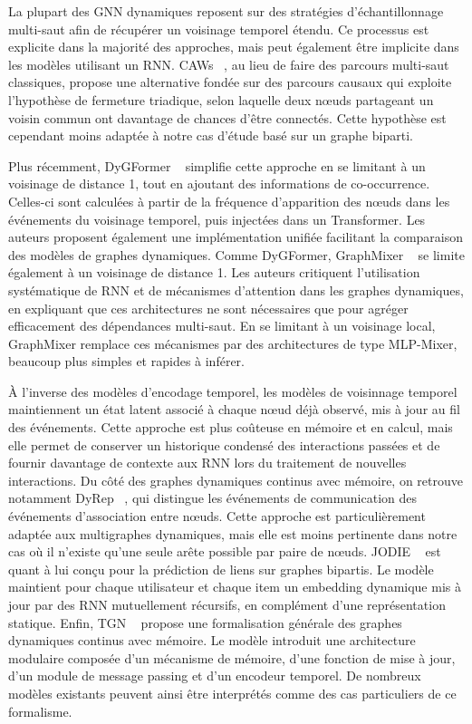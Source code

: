 \documentclass[a4paper,11pt,twoside]{StyleThese}
\begin{document}
La plupart des GNN dynamiques reposent sur des stratégies d'échantillonnage multi-saut afin de récupérer un voisinage temporel étendu. Ce processus est explicite dans la majorité des approches, mais peut également être implicite dans les modèles utilisant un RNN. CAWs ~\cite{cawn}, au lieu de faire des parcours multi-saut classiques, propose une alternative fondée sur des parcours causaux qui exploite l’hypothèse de fermeture triadique, selon laquelle deux nœuds partageant un voisin commun ont davantage de chances d’être connectés. Cette hypothèse est cependant moins adaptée à notre cas d’étude basé sur un graphe biparti. 

Plus récemment, DyGFormer ~\cite{dygformer} simplifie cette approche en se limitant à un voisinage de distance 1, tout en ajoutant des informations de co-occurrence. Celles-ci sont calculées à partir de la fréquence d’apparition des nœuds dans les événements du voisinage temporel, puis injectées dans un Transformer. Les auteurs proposent également une implémentation unifiée facilitant la comparaison des modèles de graphes dynamiques. Comme DyGFormer, GraphMixer ~\cite{graphmixer} se limite également à un voisinage de distance 1. Les auteurs critiquent l’utilisation systématique de RNN et de mécanismes d’attention dans les graphes dynamiques, en expliquant que ces architectures ne sont nécessaires que pour agréger efficacement des dépendances multi-saut. En se limitant à un voisinage local, GraphMixer remplace ces mécanismes par des architectures de type MLP-Mixer, beaucoup plus simples et rapides à inférer.

À l’inverse des modèles d'encodage temporel, les modèles de voisinnage temporel maintiennent un état latent associé à chaque nœud déjà observé, mis à jour au fil des événements. Cette approche est plus coûteuse en mémoire et en calcul, mais elle permet de conserver un historique condensé des interactions passées et de fournir davantage de contexte aux RNN lors du traitement de nouvelles interactions. Du côté des graphes dynamiques continus avec mémoire, on retrouve notamment DyRep ~\cite{dyrep}, qui distingue les événements de communication des événements d’association entre nœuds. Cette approche est particulièrement adaptée aux multigraphes dynamiques, mais elle est moins pertinente dans notre cas où il n’existe qu’une seule arête possible par paire de nœuds. JODIE ~\cite{jodie} est quant à lui conçu pour la prédiction de liens sur graphes bipartis. Le modèle maintient pour chaque utilisateur et chaque item un embedding dynamique mis à jour par des RNN mutuellement récursifs, en complément d’une représentation statique. Enfin, TGN ~\cite{tgn} propose une formalisation générale des graphes dynamiques continus avec mémoire. Le modèle introduit une architecture modulaire composée d’un mécanisme de mémoire, d’une fonction de mise à jour, d’un module de message passing et d’un encodeur temporel. De nombreux modèles existants peuvent ainsi être interprétés comme des cas particuliers de ce formalisme.
\end{document}
